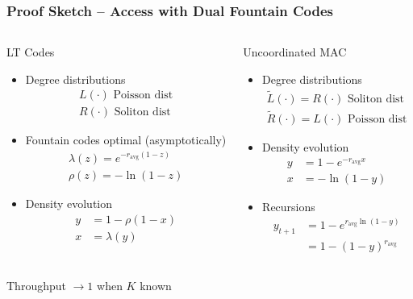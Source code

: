 \documentclass[10pt]{beamer}
\begin{document}
\begin{frame}
\frametitle{Proof Sketch -- Access with Dual Fountain Codes}
\begin{columns}
\begin{block}{LT Codes}
\begin{itemize}
\item Degree distributions
\begin{gather*}
L(\cdot) \text{ Poisson dist}\\
R(\cdot) \text{ Soliton dist}
\end{gather*}
\item Fountain codes optimal (asymptotically)
\begin{align*}
\lambda(z) = e^{- r_{\mathrm{avg}}(1-z)} \\
\rho(z) = - \ln (1-z)
\end{align*}
\item Density evolution
\begin{align*}
y &= 1 - \rho(1-x) \\
x &= \lambda(y)
\end{align*}
\end{itemize}
\end{block}
\begin{block}{Uncoordinated MAC}
\begin{itemize}
\item Degree distributions
\begin{gather*}
\tilde{L}(\cdot) = R(\cdot) \text{ Soliton dist}\\
\tilde{R}(\cdot) = L(\cdot) \text{ Poisson dist}
\end{gather*}
\item Density evolution
\begin{align*}
y %
&= 1 - e^{- r_{\mathrm{avg}}x} \\
x %
&= - \ln (1-y)
\end{align*}
\item Recursions
\begin{equation*}
\begin{split}
y_{t+1} %
&= 1 - e^{ r_{\mathrm{avg}} \ln (1-y)} \\
&= 1 - (1-y)^{r_{\mathrm{avg}}}
\end{split}
\end{equation*}
\end{itemize}
\end{block}
\end{columns}
\centerline{Throughput $\rightarrow 1$ when $K$ known}
\end{frame}
\end{document}

